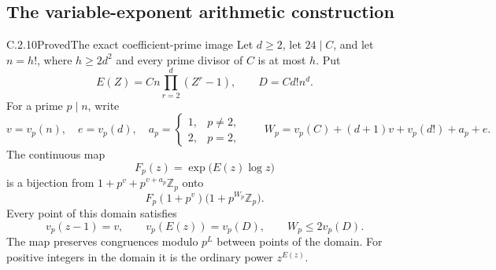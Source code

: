 \subsection{The variable-exponent arithmetic construction}

\begin{result}{C.2.10}{Proved}{The exact coefficient-prime image}
\label{lem:ghost-variable-exponent-image}
Let \(d\ge2\), let \(24\mid C\), and let
\(n=h!\), where \(h\ge2d^2\) and every prime divisor
of \(C\) is at most \(h\). Put
\[
 E(Z)=Cn\prod_{r=2}^d(Z^r-1),\qquad D=Cd!n^d.
\]
For a prime \(p\mid n\), write
\[
 v=v_p(n),\quad e=v_p(d),\quad
 a_p=\begin{cases}1,&p\ne2,\\2,&p=2,\end{cases}
 \qquad
 W_p=v_p(C)+(d+1)v+v_p(d!)+a_p+e.
\]
The continuous map
\[
 F_p(z)=\exp\bigl(E(z)\log z\bigr)
\]
is a bijection from
\(1+p^v+p^{v+a_p}\mathbb Z_p\) onto
\[
 F_p(1+p^v)\bigl(1+p^{W_p}\mathbb Z_p\bigr).
 \tag{VX.1}
\]
Every point of this domain satisfies
\[
 v_p(z-1)=v,\qquad v_p(E(z))=v_p(D),
 \qquad W_p\le2v_p(D).
 \tag{VX.2}
\]
The map preserves congruences modulo \(p^L\) between
points of the domain. For positive integers in the domain
it is the ordinary power \(z^{E(z)}\).
\end{result}
